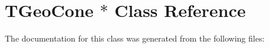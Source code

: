 \hypertarget{class_t_geo_cone_01_5}{}\section{T\+Geo\+Cone $\ast$ Class Reference}
\label{class_t_geo_cone_01_5}


The documentation for this class was generated from the following files\+: